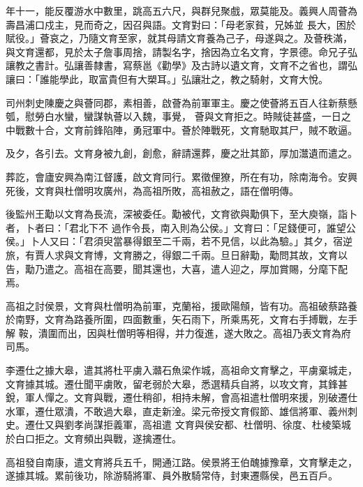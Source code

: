 \begin{pinyinscope}
 年十一，能反覆游水中數里，跳高五六尺，與群兒聚戲，眾莫能及。義興人周薈為壽昌浦口戍主，見而奇之，因召與語。文育對曰：「母老家貧，兄姊並
 長大，困於賦役。」薈哀之，乃隨文育至家，就其母請文育養為己子，母遂與之。及薈秩滿，與文育還都，見於太子詹事周捨，請製名字，捨因為立名文育，字景德。命兄子弘讓教之書計。弘讓善隸書，寫蔡邕《勸學》及古詩以遺文育，文育不之省也，謂弘讓曰：「誰能學此，取富貴但有大槊耳。」弘讓壯之，教之騎射，文育大悅。



 司州刺史陳慶之與薈同郡，素相善，啟薈為前軍軍主。慶之使薈將五百人往新蔡懸瓠，慰勞白水蠻，蠻謀執薈以入魏，事覺，
 薈與文育拒之。時賊徒甚盛，一日之中戰數十合，文育前鋒陷陣，勇冠軍中。薈於陣戰死，文育馳取其尸，賊不敢逼。



 及夕，各引去。文育身被九創，創愈，辭請還葬，慶之壯其節，厚加灊遺而遣之。



 葬訖，會廬安興為南江督護，啟文育同行。累徵俚獠，所在有功，除南海令。安興死後，文育與杜僧明攻廣州，為高祖所敗，高祖赦之，語在僧明傳。



 後監州王勱以文育為長流，深被委任。勱被代，文育欲與勱俱下，至大庾嶺，詣卜者，卜者曰：「君北下不
 過作令長，南入則為公侯。」文育曰：「足錢便可，誰望公侯。」卜人又曰：「君須臾當暴得銀至二千兩，若不見信，以此為驗。」其夕，宿逆旅，有賈人求與文育博，文育勝之，得銀二千兩。旦日辭勱，勱問其故，文育以告，勱乃遣之。高祖在高要，聞其還也，大喜，遣人迎之，厚加賞賜，分麾下配焉。



 高祖之討侯景，文育與杜僧明為前軍，克蘭裕，援歐陽頠，皆有功。高祖破蔡路養於南野，文育為路養所圍，四面數重，矢石雨下，所乘馬死，文育右手搏戰，左手解
 鞍，潰圍而出，因與杜僧明等相得，并力復進，遂大敗之。高祖乃表文育為府司馬。



 李遷仕之據大皋，遣其將杜平虜入灨石魚梁作城，高祖命文育擊之，平虜棄城走，文育據其城。遷仕聞平虜敗，留老弱於大皋，悉選精兵自將，以攻文育，其鋒甚銳，軍人憚之。文育與戰，遷仕稍卻，相持未解，會高祖遣杜僧明來援，別破遷仕水軍，遷仕眾潰，不敢過大皋，直走新淦。梁元帝授文育假節、雄信將軍、義州刺史。遷仕又與劉孝尚謀拒義軍，高祖遣
 文育與侯安都、杜僧明、徐度、杜棱築城於白口拒之。文育頻出與戰，遂擒遷仕。



 高祖發自南康，遣文育將兵五千，開通江路。侯景將王伯醜據豫章，文育擊走之，遂據其城。累前後功，除游騎將軍、員外散騎常侍，封東遷縣侯，邑五百戶。




\end{pinyinscope}
